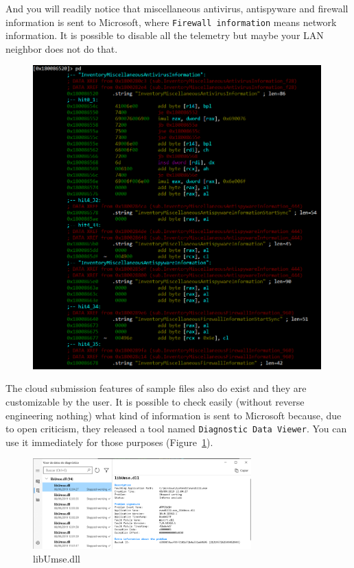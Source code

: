 And you will readily notice that miscellaneous antivirus, antispyware and
firewall information is sent to Microsoft, where \texttt{Firewall information}
means network information. It is possible to disable all the telemetry but
maybe your LAN neighbor does not do that.
\begin{figure}[h]
  \centering
  \includegraphics[width=0.99\textwidth]{./figures/MiscellaneousAntivirus}
\end{figure}

The cloud submission features of sample files also do exist and they are
customizable by the user. It is possible to check easily (without reverse
engineering nothing) what kind of information is sent to Microsoft because,
due to open criticism, they released a tool named \texttt{Diagnostic Data
  Viewer}. You can use it immediately for those purposes (Figure~\ref{fig:libUmse}).
\begin{figure}[h]
  \centering
  \includegraphics[width=0.75\textwidth]{./figures/libUmse}
  \caption{\label{fig:libUmse} libUmse.dll}
\end{figure}

